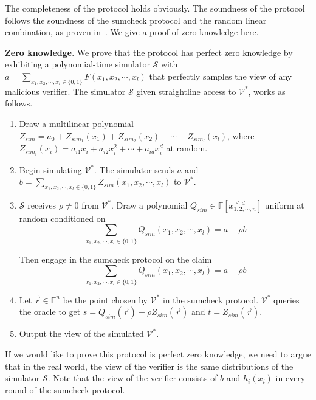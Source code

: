 The completeness of the protocol holds obviously. The soundness of the protocol follows the soundness of the sumcheck protocol and the random linear combination, as proven in~\cite{zksumcheck}. We give a proof of zero-knowledge here.

\medskip\noindent\textbf{Zero knowledge}. We prove that the protocol has perfect zero knowledge by exhibiting a polynomial-time simulator $\mathcal{S}$ with $a = \sum\limits_{x_1, x_2, \cdots, x_l \in \{0, 1\}}F(x_1, x_2, \cdots, x_l)$ that perfectly samples the view of any malicious verifier. The simulator $\mathcal{S}$ given straightline access to $\mathcal{V^*}$, works as follows.

\begin{enumerate}

\item Draw a multilinear polynomial $Z_{sim} = a_{0} + Z_{sim_1}(x_1) + Z_{sim_2}(x_2) + \cdots + Z_{sim_l}(x_l)$, where $Z_{sim_i}(x_i) = a_{i1}x_i + a_{i2}x_i^2 + \cdots + a_{id}x_i^d$ at random. 

\item Begin simulating $\mathcal{V}^*$. The simulator sends $a$ and $b = \sum\limits_{x_1, x_2, \cdots, x_l \in \{0, 1\}}Z_{sim}(x_1, x_2, \cdots, x_l)$ to $\mathcal{V}^*$.

\item $\mathcal{S}$ receives $\rho \neq 0$ from $\mathcal{V^*}$. Draw a polynomial $Q_{sim} \in \mathbb{F}[x_{1, 2, \cdots, n}^{\leqslant d}]$ uniform at random conditioned on $$ \sum\limits_{x_1, x_2, \cdots, x_l \in \{0, 1\}}Q_{sim}(x_1, x_2, \cdots, x_l) = a + \rho b$$ 

Then engage in the sumcheck protocol on the claim $$\sum\limits_{x_1, x_2, \cdots, x_l \in \{0, 1\}}Q_{sim}(x_1, x_2, \cdots, x_l) = a + \rho b$$

\item Let $\vec{r} \in \mathbb{F}^n$ be the point chosen by $\mathcal{V}^*$ in the sumcheck protocol. $\mathcal{V}^*$ queries the oracle to get $s = Q_{sim}(\vec{r}) - \rho Z_{sim}(\vec{r})$ and $t = Z_{sim}(\vec{r})$. 

\item Output the view of the simulated $\mathcal{V}^*$.
\end{enumerate} 

If we would like to prove this protocol is perfect zero knowledge, we need to argue that in the real world, the view of the verifier is the same distributions of the simulator $\mathcal{S}$. Note that the view of the verifier consists of $b$ and $h_i(x_i)$ in every round of the sumcheck protocol.


